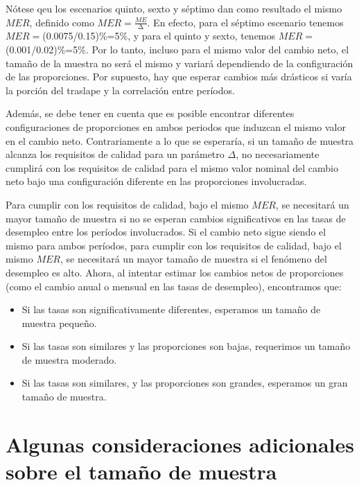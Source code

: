 \documentclass[
  12pt,
]{book}
\providecommand{\tightlist}{%
  \setlength{\itemsep}{0pt}\setlength{\parskip}{0pt}}
\begin{document}
Nótese qeu los escenarios quinto, sexto y séptimo dan como resultado el mismo \(MER\), definido como
\(MER=\frac{ME}{\mathrm{\Delta}}\). En efecto, para el séptimo escenario tenemos \(MER=\)(0.0075/0.15)\%=5\%, y para el quinto y sexto, tenemos \(MER=\)(0.001/0.02)\%=5\%. Por lo tanto, incluso para el mismo valor del cambio neto, el tamaño de la muestra no será el mismo y variará dependiendo de la configuración de las proporciones. Por supuesto, hay que esperar cambios más drásticos si varía la porción del traslape y la correlación entre períodos.

Además, se debe tener en cuenta que es posible encontrar diferentes configuraciones de proporciones en ambos periodos que induzcan el mismo valor en el cambio neto. Contrariamente a lo que se esperaría, si un tamaño de muestra alcanza los requisitos de calidad para un parámetro \(\Delta\), no necesariamente cumplirá con los requisitos de calidad para el mismo valor nominal del cambio neto bajo una configuración diferente en las proporciones involucradas.

Para cumplir con los requisitos de calidad, bajo el mismo \(MER\), se necesitará un mayor tamaño de muestra si no se esperan cambios significativos en las tasas de desempleo entre los períodos involucrados. Si el cambio neto sigue siendo el mismo para ambos períodos, para cumplir con los requisitos de calidad, bajo el mismo \(MER\), se necesitará un mayor tamaño de muestra si el fenómeno del desempleo es alto. Ahora, al intentar estimar los cambios netos de proporciones (como el cambio anual o mensual en las tasas de desempleo), encontramos que:

\begin{itemize}
\tightlist
\item
  Si las tasas son significativamente diferentes, esperamos un tamaño de muestra pequeño.
\item
  Si las tasas son similares y las proporciones son bajas, requerimos un tamaño de muestra moderado.
\item
  Si las tasas son similares, y las proporciones son grandes, esperamos un gran tamaño de muestra.
\end{itemize}

\hypertarget{algunas-consideraciones-adicionales-sobre-el-tamauxf1o-de-muestra}{%
\section{Algunas consideraciones adicionales sobre el tamaño de muestra}\label{algunas-consideraciones-adicionales-sobre-el-tamauxf1o-de-muestra}}
\end{document}
